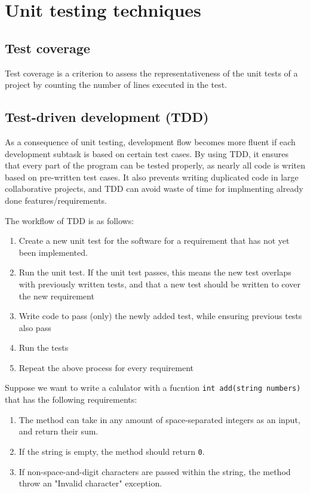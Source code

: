 \section{Unit testing techniques}
\subsection{Test coverage}
Test coverage is a criterion to assess the representativeness of the unit tests of a project by counting the number of lines executed in the test.


\subsection{Test-driven development (TDD)}
As a consequence of unit testing, development flow becomes more fluent if each development subtask is based on certain test cases. By using TDD, it ensures that every part of the program can be tested properly, as nearly all code is writen based on pre-written test cases. It also prevents writing duplicated code in large collaborative projects, and TDD can avoid waste of time for implmenting already done features/requirements. 

The workflow of TDD is as follows:

\begin{enumerate}
	\item Create a new unit test for the software for a requirement that has not yet been implemented. 
	\item Run the unit test. If the unit test passes, this means the new test overlaps with previously written tests, and that a new test should be written to cover the new requirement
	\item Write code to pass (only) the newly added test, while ensuring previous tests also pass
	\item Run the tests
	\item Repeat the above process for every requirement
\end{enumerate}

Suppose we want to write a calulator with a fucntion \texttt{int add(string numbers)} that has the following requirements:

\begin{enumerate}
	\item The method can take in any amount of space-separated integers as an input, and return their sum.
	\item If the string is empty, the method should return \texttt{0}.
	\item If non-space-and-digit characters are passed within the string, the method throw an "Invalid character" exception. 
\end{enumerate}

